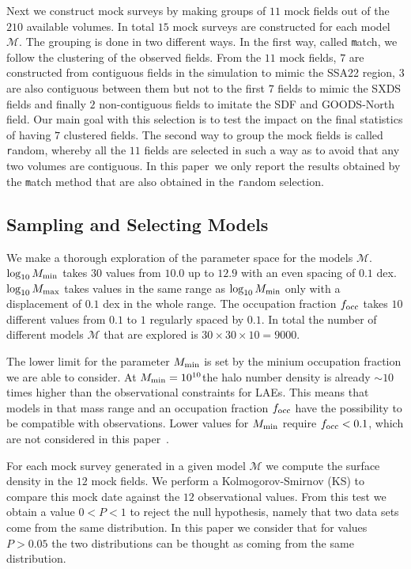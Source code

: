 \documentclass[usenatbib]{mn2e}
\newcommand{\documentname}{paper~}
\newcommand{\hMsun}{{\ifmmode{h^{-1}{\rm
        {M_{\odot}}}}\else{$h^{-1}{\rm{M_{\odot}}}$}\fi}}
\begin{document}
Next we construct mock surveys by making groups of $11$ mock fields
out of the $210$ available volumes. In total $15$ mock surveys are
constructed for each model $\mathcal{M}$. The grouping is done in two
different ways. In the first way, called {\texttt match}, we follow
the clustering of the observed fields. From the $11$ mock fields, $7$
are constructed from contiguous fields in the simulation to mimic the
SSA22 region, $3$ are also contiguous between them but not to the first
$7$ fields to mimic the SXDS fields and finally $2$ non-contiguous
fields to imitate the SDF and GOODS-North field. Our main goal with
this selection is to test the impact on the final statistics of having
$7$ clustered fields. The second way to group the mock fields is called {\texttt
  random}, whereby all the $11$ fields are selected in such a way as
to avoid that any two volumes are contiguous. In this \documentname we
only report the results obtained by the {\texttt match} method that
are also obtained in the {\texttt random} selection.





\subsection{Sampling and Selecting Models}

We make a thorough exploration of the parameter space for the models
${\mathcal M}$. $\log_{10} M_{\rm min}$ takes $30$ values from $10.0$ up
to $12.9$ with an even spacing of $0.1$ dex. $\log_{10} M_{\rm max}$
takes values in the same range as $\log_{10}M_{\rm min}$ only with a
displacement of $0.1$ dex in the whole range. The occupation fraction
$f_{\rm occ}$ takes $10$ different values from $0.1$ to $1$ regularly
spaced by $0.1$. In total the number of different models ${\mathcal
  M}$ that are explored is $30 \times 30 \times 10 = 9000$. 


The lower limit for the parameter $M_{\rm min}$ is set by the minium
occupation fraction we are able to consider. At $M_{\rm
  min}=10^{10}$\hMsun the halo number density is already $\sim 10$
times higher than the observational constraints for LAEs. This means
that models in that mass range and an occupation fraction $f_{\rm
  occ}$ have the possibility to be compatible with observations. Lower
values for $M_{\rm min}$ require $f_{\rm occ}<0.1$, which are not
considered in this \documentname. 

For each mock survey generated in a given model ${\mathcal M}$ we
compute the surface density in the $12$ mock fields. We perform a
Kolmogorov-Smirnov (KS) to compare this mock date against the $12$
observational values. From this test we obtain a value $0<P<1$ to
reject the null hypothesis, namely that two data sets come from the
same distribution. In this paper we consider that for values $P>0.05$
the two distributions can be thought as coming from the same
distribution.
\end{document}
